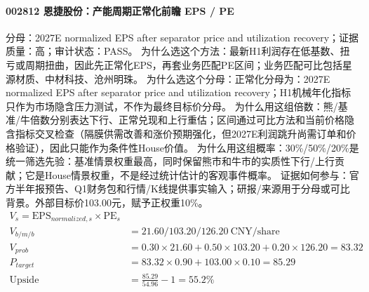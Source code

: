 \paragraph{002812 恩捷股份：产能周期正常化前瞻 EPS / PE}
分母：2027E normalized EPS after separator price and utilization recovery；证据质量：高；审计状态：PASS。
为什么选这个方法：最新H1利润存在低基数、扭亏或周期扭曲，因此先正常化EPS，再套业务匹配PE区间；业务匹配可比包括星源材质、中材科技、沧州明珠。
为什么选这个分母：正常化分母为：2027E normalized EPS after separator price and utilization recovery；H1机械年化指标只作为市场隐含压力测试，不作为最终目标价分母。
为什么用这组倍数：熊/基准/牛倍数分别表达下行、正常兑现和上行重估；区间通过可比方法和当前价格隐含指标交叉检查（隔膜供需改善和涨价预期强化，但2027E利润跳升尚需订单和价格验证），因此只能作为条件性House价值。
为什么用这组概率：30\%/50\%/20\%是统一筛选先验：基准情景权重最高，同时保留熊市和牛市的实质性下行/上行贡献；它是House情景权重，不是经过统计估计的客观事件概率。
证据如何参与：官方半年报预告、Q1财务包和行情/K线提供事实输入；研报/来源用于分母或可比背景。外部目标价103.00元，赋予正权重10\%。
\begin{align*}
V_s=\mathrm{EPS}_{normalized,s}\times \mathrm{PE}_s\\
V_{b/m/b} &= 21.60/103.20/126.20\ \mathrm{CNY/share}\\
V_{prob} &= 0.30\times 21.60+0.50\times 103.20+0.20\times 126.20=83.32\\
P_{target} &= 83.32\times 0.90+103.00\times 0.10=85.29\\
\mathrm{Upside} &= \frac{85.29}{54.96}-1=55.2\%\\
\end{align*}

